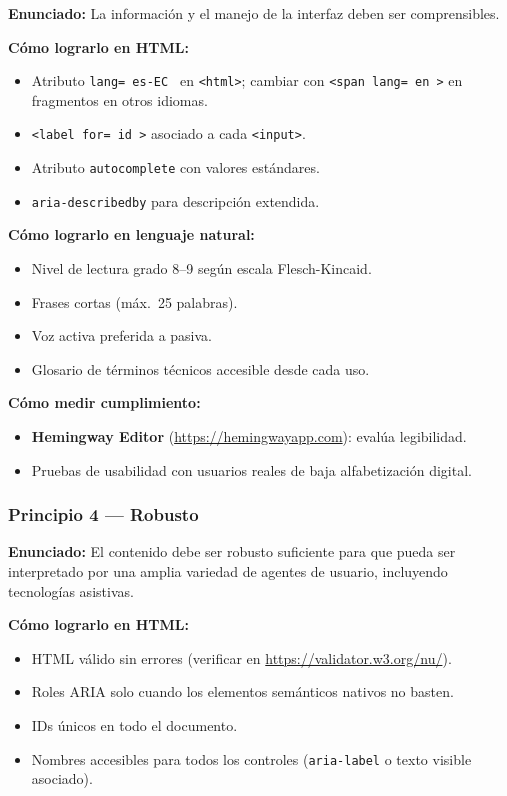 \textbf{Enunciado:} La información y el manejo de la interfaz deben
ser comprensibles.

\textbf{Cómo lograrlo en HTML:}
\begin{itemize}
\item Atributo \texttt{lang= es-EC } en \texttt{<html>}; cambiar con
\texttt{<span lang= en >} en fragmentos en otros idiomas.
\item \texttt{<label for= id >} asociado a cada \texttt{<input>}.
\item Atributo \texttt{autocomplete} con valores estándares.
\item \texttt{aria-describedby} para descripción extendida.
\end{itemize}

\textbf{Cómo lograrlo en lenguaje natural:}
\begin{itemize}
\item Nivel de lectura grado 8--9 según escala Flesch-Kincaid.
\item Frases cortas (máx.\ 25 palabras).
\item Voz activa preferida a pasiva.
\item Glosario de términos técnicos accesible desde cada uso.
\end{itemize}

\textbf{Cómo medir cumplimiento:}
\begin{itemize}
\item \textbf{Hemingway Editor} (\url{https://hemingwayapp.com}):
evalúa legibilidad.
\item Pruebas de usabilidad con usuarios reales de baja
alfabetización digital.
\end{itemize}

\subsubsection{Principio 4 --- Robusto}

\textbf{Enunciado:} El contenido debe ser robusto suficiente para que
pueda ser interpretado por una amplia variedad de agentes de usuario,
incluyendo tecnologías asistivas.

\textbf{Cómo lograrlo en HTML:}
\begin{itemize}
\item HTML válido sin errores (verificar en
\url{https://validator.w3.org/nu/}).
\item Roles ARIA solo cuando los elementos semánticos nativos no
basten.
\item IDs únicos en todo el documento.
\item Nombres accesibles para todos los controles
(\texttt{aria-label} o texto visible asociado).
\end{itemize}

